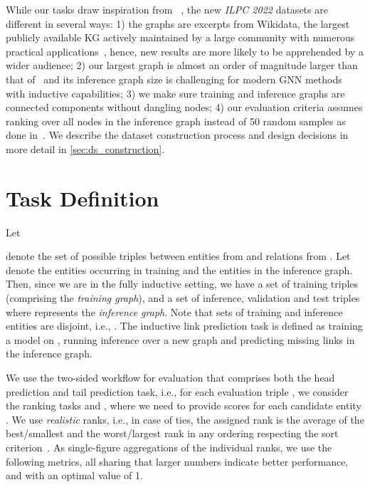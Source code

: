 \documentclass[sigconf,screen]{acmart}
\newcommand{\ilpc}{\textsl{\textsc{ILPC 2022}}\xspace}
\begin{document}
While our tasks draw inspiration from ~\cite{teru2020inductive}, the new \ilpc datasets are different in several ways: 1) the graphs are excerpts from Wikidata, the largest publicly available KG actively maintained by a large community with numerous practical applications~\cite{christmann2019look, decao2020autoregressive, decao2020multilingual}, hence, new results are more likely to be apprehended by a wider audience; 2) our largest graph is almost an order of magnitude larger than that of~\cite{teru2020inductive} and its inference graph size is challenging for modern GNN methods with inductive capabilities; 3) we make sure training and inference graphs are connected components without dangling nodes; 4) our evaluation criteria assumes ranking over all nodes in the inference graph instead of 50 random samples as done in~\cite{teru2020inductive}.
We describe the dataset construction process and design decisions in more detail in \cref{sec:ds_construction}.




\section{Task Definition}

Let

denote the set of possible triples between entities from  and relations from .
Let  denote the entities occurring in training and  the entities in the inference graph.
Then, since we are in the fully inductive setting, we have a set of training triples  (comprising the \emph{training graph}), and a set of inference, validation and test triples 
 where  represents the \emph{inference graph}. 
Note that sets of training and inference entities are disjoint, i.e., .
The inductive link prediction task is defined as training a model on , running inference over a new graph  and predicting missing links in the inference graph.

We use the two-sided workflow for evaluation that comprises both the head prediction and tail prediction task, i.e., for each evaluation triple , we consider the ranking tasks  and , where we need to provide scores for each candidate entity .
We use \textit{realistic} ranks, i.e., in case of ties, the assigned rank is the average of the best/smallest and the worst/largest rank in any ordering respecting the sort criterion~\cite{Berrendorf2020}.
As single-figure aggregations of the individual ranks, we use the following metrics, all sharing that larger numbers indicate better performance, and with an optimal value of 1.
\end{document}
